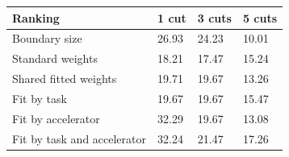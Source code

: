 \begin{tabular}{@{}llll@{}}
\toprule
Ranking & 1 cut & 3 cuts & 5 cuts \\
\midrule
Boundary size & 26.93 & 24.23 & 10.01 \\
Standard weights & 18.21 & 17.47 & 15.24 \\
Shared fitted weights & 19.71 & 19.67 & 13.26 \\
Fit by task & 19.67 & 19.67 & 15.47 \\
Fit by accelerator & 32.29 & 19.67 & 13.08 \\
Fit by task and accelerator & 32.24 & 21.47 & 17.26 \\
\bottomrule
\end{tabular}
